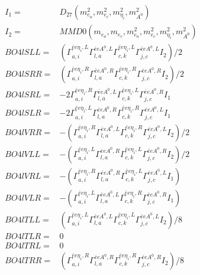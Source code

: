 \documentclass[A4,landscape]{article}
\begin{document}
\begin{align} 
I_1 = & D_{27}(m^2_{e_{{a}}}, m^2_{e_{{c}}}, m^2_{\eta_i}, m^2_{A^0}) \\ 
I_2 = & MMD0(m_{e_{{a}}}, m_{e_{{c}}}, m^2_{e_{{a}}}, m^2_{e_{{c}}}, m^2_{\eta_i}, m^2_{A^0}) \\ 
  BO4lSLL= & ( \Gamma^{\bar{e}e \eta_i ,L}_{a, i} \Gamma^{\bar{e}e A^0 ,L}_{l, a} \Gamma^{\bar{e}e \eta_i ,L}_{c, k} \Gamma^{\bar{e}e A^0 ,L}_{j, c} I_2)/2 \\ 
  BO4lSRR= & ( \Gamma^{\bar{e}e \eta_i ,R}_{a, i} \Gamma^{\bar{e}e A^0 ,R}_{l, a} \Gamma^{\bar{e}e \eta_i ,R}_{c, k} \Gamma^{\bar{e}e A^0 ,R}_{j, c} I_2)/2 \\ 
  BO4lSRL= & -2  \Gamma^{\bar{e}e \eta_i ,R}_{a, i} \Gamma^{\bar{e}e A^0 ,L}_{l, a} \Gamma^{\bar{e}e \eta_i ,L}_{c, k} \Gamma^{\bar{e}e A^0 ,R}_{j, c} I_1 \\ 
  BO4lSLR= & -2  \Gamma^{\bar{e}e \eta_i ,L}_{a, i} \Gamma^{\bar{e}e A^0 ,R}_{l, a} \Gamma^{\bar{e}e \eta_i ,R}_{c, k} \Gamma^{\bar{e}e A^0 ,L}_{j, c} I_1 \\ 
  BO4lVRR= & -( \Gamma^{\bar{e}e \eta_i ,R}_{a, i} \Gamma^{\bar{e}e A^0 ,L}_{l, a} \Gamma^{\bar{e}e \eta_i ,R}_{c, k} \Gamma^{\bar{e}e A^0 ,L}_{j, c} I_2)/2 \\ 
  BO4lVLL= & -( \Gamma^{\bar{e}e \eta_i ,L}_{a, i} \Gamma^{\bar{e}e A^0 ,R}_{l, a} \Gamma^{\bar{e}e \eta_i ,L}_{c, k} \Gamma^{\bar{e}e A^0 ,R}_{j, c} I_2)/2 \\ 
  BO4lVRL= & -( \Gamma^{\bar{e}e \eta_i ,R}_{a, i} \Gamma^{\bar{e}e A^0 ,R}_{l, a} \Gamma^{\bar{e}e \eta_i ,L}_{c, k} \Gamma^{\bar{e}e A^0 ,L}_{j, c} I_1) \\ 
  BO4lVLR= & -( \Gamma^{\bar{e}e \eta_i ,L}_{a, i} \Gamma^{\bar{e}e A^0 ,L}_{l, a} \Gamma^{\bar{e}e \eta_i ,R}_{c, k} \Gamma^{\bar{e}e A^0 ,R}_{j, c} I_1) \\ 
  BO4lTLL= & ( \Gamma^{\bar{e}e \eta_i ,L}_{a, i} \Gamma^{\bar{e}e A^0 ,L}_{l, a} \Gamma^{\bar{e}e \eta_i ,L}_{c, k} \Gamma^{\bar{e}e A^0 ,L}_{j, c} I_2)/8 \\ 
  BO4lTLR= & 0 \\ 
  BO4lTRL= & 0 \\ 
  BO4lTRR= & ( \Gamma^{\bar{e}e \eta_i ,R}_{a, i} \Gamma^{\bar{e}e A^0 ,R}_{l, a} \Gamma^{\bar{e}e \eta_i ,R}_{c, k} \Gamma^{\bar{e}e A^0 ,R}_{j, c} I_2)/8 \\ 
\end{align} 
\end{document}
